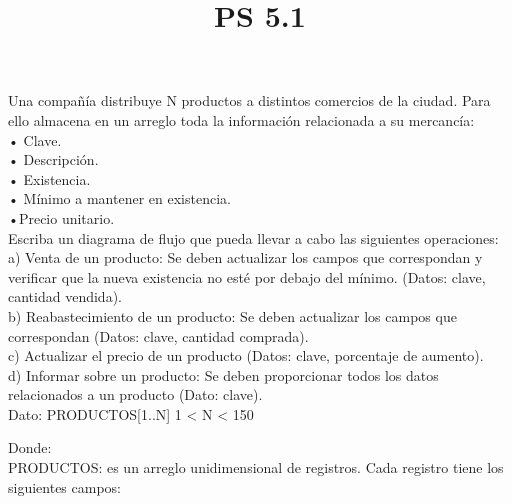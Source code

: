 \documentclass[11pt]{amsart}
\title{PS 5.1}
\begin{document}
\maketitle

\noindent Una compañía distribuye N productos a distintos comercios de la ciudad. Para ello almacena en un arreglo toda la información relacionada a su mercancía:\\

\noindent • Clave. \\

\noindent • Descripción. \\

\noindent • Existencia.\\

\noindent • Mínimo a mantener en existencia. \\

\noindent •Precio unitario.\\

\noindent Escriba un diagrama de flujo que pueda llevar a cabo las siguientes operaciones:\\

\noindent a) Venta de un producto: Se deben actualizar los campos que correspondan y verificar que la nueva existencia no esté por debajo del mínimo. (Datos: clave, cantidad vendida).\\

\noindent b) Reabastecimiento de un producto: Se deben actualizar los campos que correspondan (Datos: clave, cantidad comprada).\\

\noindent c) Actualizar el precio de un producto (Datos: clave, porcentaje de aumento).\\

\noindent d) Informar sobre un producto: Se deben proporcionar todos los datos relacionados a un producto (Dato: clave).\\

\noindent Dato: PRODUCTOS[1..N] 1 < N < 150

\noindent Donde:\\

\noindent PRODUCTOS: es un arreglo unidimensional de registros. Cada registro tiene los siguientes campos:\\
\end{document}
